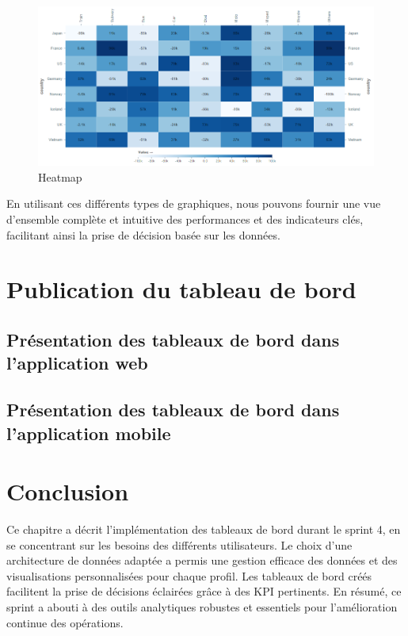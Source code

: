 \begin{figure}[ht]
    \centering \includegraphics[scale=0.6]{chap6.images/heatmap.png}
    \caption{Heatmap}
    \label{Heatmap}
\end{figure}
\noindent
En utilisant ces différents types de graphiques, nous pouvons fournir une vue d'ensemble complète et intuitive des performances et des indicateurs clés, facilitant ainsi la prise de décision basée sur les données.
\newpage
\section{Publication du tableau de bord}

\subsection{Présentation des tableaux de bord  dans l'application web}
\subsection{Présentation des tableaux de bord  dans l'application mobile}



\section*{Conclusion}
Ce chapitre a décrit l'implémentation des tableaux de bord durant le sprint 4, en se concentrant sur les besoins des différents utilisateurs. Le choix d'une architecture de données adaptée a permis une gestion efficace des données et des visualisations personnalisées pour chaque profil. Les tableaux de bord créés facilitent la prise de décisions éclairées grâce à des KPI pertinents. En résumé, ce sprint a abouti à des outils analytiques robustes et essentiels pour l'amélioration continue des opérations.







